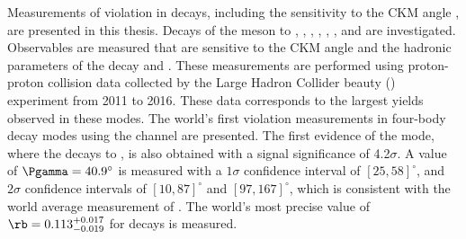 
Measurements of \CP violation in \btodkst decays, including the sensitivity to the CKM angle \Pgamma, are presented in this thesis. Decays of the \Dz meson to \Km\pip, \Km\Kp, \pim\pip, \pim\Kp, \Km\pip\pim\pip, \pim\pip\pim\pip, and \pim\Kp\pim\pip are investigated. Observables are measured that are sensitive to the CKM angle \Pgamma and the hadronic parameters of the decay \rb and \deltab. These measurements are performed using proton-proton collision data collected by the Large Hadron Collider beauty (\lhcb) experiment from 2011 to 2016. These data corresponds to the largest yields observed in these modes. The world's first \CP violation measurements in four-body \Dz decay modes using the \btodkst channel are presented. The first evidence of the \btodkst mode, where the \Dz decays to \pim\Kp, is also obtained with a signal significance of 4.2$\sigma$. A value of $\Pgamma = 40.9^{\circ}$ is measured with a $1\sigma$ confidence interval of $[25, 58]^{\circ}$, and $2\sigma$ confidence intervals of $[10, 87]^{\circ}$ and $[97,167]^{\circ}$, which is consistent with the world average measurement of \Pgamma. The world's most precise value of $\rb = 0.113^{+0.017}_{-0.019}$ for \btodkst decays is measured.
